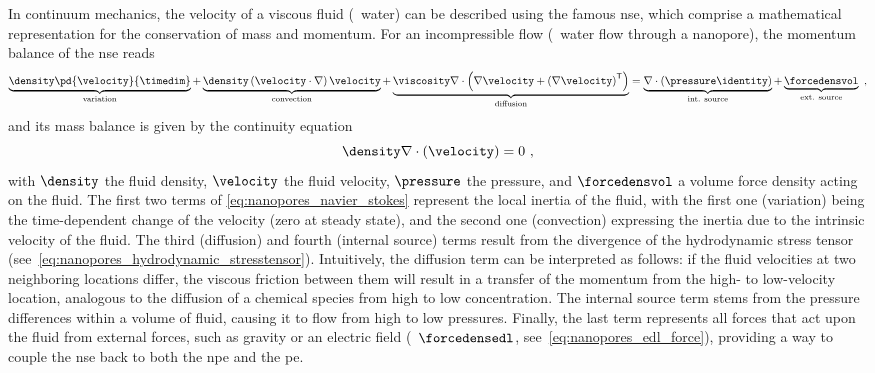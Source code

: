 In continuum mechanics, the velocity of a viscous fluid (\eg~water) can be described using the famous
\gls{nse}, which comprise a mathematical representation for the conservation of mass and momentum. For an
incompressible flow (\ie~water flow through a nanopore), the momentum balance of the \gls{nse} reads
%
\begin{equation}\label{eq:nanopores_navier_stokes}
  \underbrace{ \density \pd{\velocity}{\timedim} }_{\text{variation}}
  +
  \underbrace{ \density \left( \velocity \cdot \nabla \right) \velocity }_{\text{convection}}
  +
  \underbrace{ \viscosity \nabla \cdot \left(
    \nabla \velocity + \left(\nabla\velocity \right)^\mathsf{T} \right) }_{\text{diffusion}}
  =
  \underbrace{\nabla \cdot \left(\pressure \identity \right)}_{\text{int. source}}
  +
  \underbrace{ \forcedensvol }_{\text{ext. source}}
  \text{ ,}
\end{equation}
%
and its mass balance is given by the continuity equation
%
\begin{equation}\label{eq:nanopores_velocity_continuity}
  \density \nabla \cdot \left( \velocity \right) = 0
  \text{ ,}
\end{equation}
%
with $\density$ the fluid density, $\velocity$ the fluid velocity, $\pressure$ the pressure, and
$\forcedensvol$ a volume force density acting on the fluid. The first two terms of
\cref{eq:nanopores_navier_stokes} represent the local inertia of the fluid, with the first one (variation)
being the time-dependent change of the velocity (zero at steady state), and the second one (convection)
expressing the inertia due to the intrinsic velocity of the fluid. The third (diffusion) and fourth (internal
source) terms result from the divergence of the hydrodynamic stress tensor
(see~\cref{eq:nanopores_hydrodynamic_stresstensor}). Intuitively, the diffusion term can be interpreted as
follows: if the fluid velocities at two neighboring locations differ, the viscous friction between them will
result in a transfer of the momentum from the high- to low-velocity location, analogous to the diffusion of a
chemical species from high to low concentration. The internal source term stems from the pressure differences
within a volume of fluid, causing it to flow from high to low pressures. Finally, the last term represents all
forces that act upon the fluid from external forces, such as gravity or an electric field
(\ie~$\forcedensedl$, see~\cref{eq:nanopores_edl_force}), providing a way to couple the \gls{nse} back to both
the \gls{npe} and the \gls{pe}.

